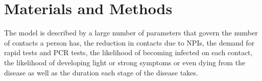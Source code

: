 \section{Materials and Methods}
\label{sec:materials_and_methods}

The model is described by a large number of parameters that govern the number of
contacts a person has, the reduction in contacts due to NPIs, the demand for rapid tests
and PCR tests, the likelihood of becoming infected on each contact, the likelihood of
developing light or strong symptoms or even dying from the disease as well as the
duration each stage of the disease takes.























